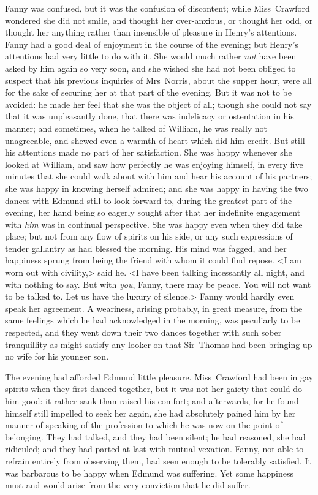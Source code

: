 Fanny was confused, but it was the confusion of discontent; while Miss~Crawford wondered she did not smile, and thought her over-anxious, or thought her odd, or thought her anything rather than insensible of pleasure in Henry's attentions. Fanny had a good deal of enjoyment in the course of the evening; but Henry's attentions had very little to do with it. She would much rather \textit{not}  have been asked by him again so very soon, and she wished she had not been obliged to suspect that his previous inquiries of Mrs~Norris, about the supper hour, were all for the sake of securing her at that part of the evening. But it was not to be avoided: he made her feel that she was the object of all; though she could not say that it was unpleasantly done, that there was indelicacy or ostentation in his manner; and sometimes, when he talked of William, he was really not unagreeable, and shewed even a warmth of heart which did him credit. But still his attentions made no part of her satisfaction. She was happy whenever she looked at William, and saw how perfectly he was enjoying himself, in every five minutes that she could walk about with him and hear his account of his partners; she was happy in knowing herself admired; and she was happy in having the two dances with Edmund still to look forward to, during the greatest part of the evening, her hand being so eagerly sought after that her indefinite engagement with \textit{him}  was in continual perspective. She was happy even when they did take place; but not from any flow of spirits on his side, or any such expressions of tender gallantry as had blessed the morning. His mind was fagged, and her happiness sprung from being the friend with whom it could find repose. <I am worn out with civility,> said he. <I have been talking incessantly all night, and with nothing to say. But with \textit{you}, Fanny, there may be peace. You will not want to be talked to. Let us have the luxury of silence.> Fanny would hardly even speak her agreement. A weariness, arising probably, in great measure, from the same feelings which he had acknowledged in the morning, was peculiarly to be respected, and they went down their two dances together with such sober tranquillity as might satisfy any looker-on that Sir~Thomas had been bringing up no wife for his younger son.

The evening had afforded Edmund little pleasure. Miss~Crawford had been in gay spirits when they first danced together, but it was not her gaiety that could do him good: it rather sank than raised his comfort; and afterwards, for he found himself still impelled to seek her again, she had absolutely pained him by her manner of speaking of the profession to which he was now on the point of belonging. They had talked, and they had been silent; he had reasoned, she had ridiculed; and they had parted at last with mutual vexation. Fanny, not able to refrain entirely from observing them, had seen enough to be tolerably satisfied. It was barbarous to be happy when Edmund was suffering. Yet some happiness must and would arise from the very conviction that he did suffer.

